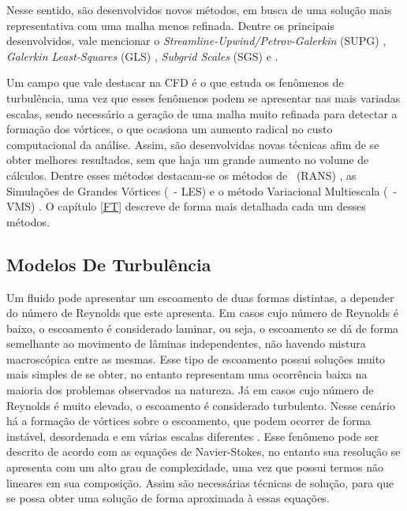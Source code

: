 Nesse sentido, são desenvolvidos novos métodos, em busca de uma solução mais representativa com uma malha menos refinada. Dentre os principais desenvolvidos, vale mencionar o \textit{Streamline-Upwind/Petrov-Galerkin} (SUPG) \cite{brooks1982streamline}, \textit{Galerkin Least-Squares} (GLS) \cite{hughes1989new,tezduyar1991stabilized}, \textit{Subgrid Scales} (SGS) e \cite{hughes1995multiscale}.

Um campo que vale destacar na CFD é o que estuda os fenômenos de turbulência, uma vez que esses fenômenos podem se apresentar nas mais variadas escalas, sendo necessário a geração de uma malha muito refinada para detectar a formação dos vórtices, o que ocasiona um aumento radical no custo computacional da análise. Assim, são desenvolvidas novas técnicas afim de se obter melhores resultados, sem que haja um grande aumento no volume de cálculos. Dentre esses métodos destacam-se os métodos de \RANS\ (RANS) \cite{speziale1991analytical,alfonsi2009reynolds,ling2015evaluation}, as Simulações de Grandes Vórtices (\LES\ - LES) \cite{germano1991dynamic,piomelli1999large,hughes2000large,vsekutkovski2021partitioned} e o método Variacional Multiescala (\VMS\ - VMS) \cite{hughes1995multiscale,hughes1998variational,hughes2002variational,bazilevs2010large,bazilevs2013computational}. O capítulo \ref{FT} descreve de forma mais detalhada cada um desses métodos.


\subsection{Modelos De Turbulência} \label{MT}

Um fluido pode apresentar um escoamento de duas formas distintas, a depender do número de Reynolds que este apresenta. Em casos cujo número de Reynolds é baixo, o escoamento é considerado laminar, ou seja, o escoamento se dá de forma semelhante ao movimento de lâminas independentes, não havendo mistura macroscópica entre as mesmas. Esse tipo de escoamento possui soluções muito mais simples de se obter, no entanto representam uma ocorrência baixa na maioria dos problemas observados na natureza. Já em casos cujo número de Reynolds é muito elevado, o escoamento é considerado turbulento. Nesse cenário há a formação de vórtices sobre o escoamento, que podem ocorrer de forma instável, desordenada e em várias escalas diferentes \cite{popiolek2005analise,shaughnessy2005introduction}. Esse fenômeno pode ser descrito de acordo com as equações de Navier-Stokes, no entanto sua resolução se apresenta com um alto grau de complexidade, uma vez que possui termos não lineares em sua composição. Assim são necessárias técnicas de solução, para que se possa obter uma solução de forma aproximada à essas equações.

